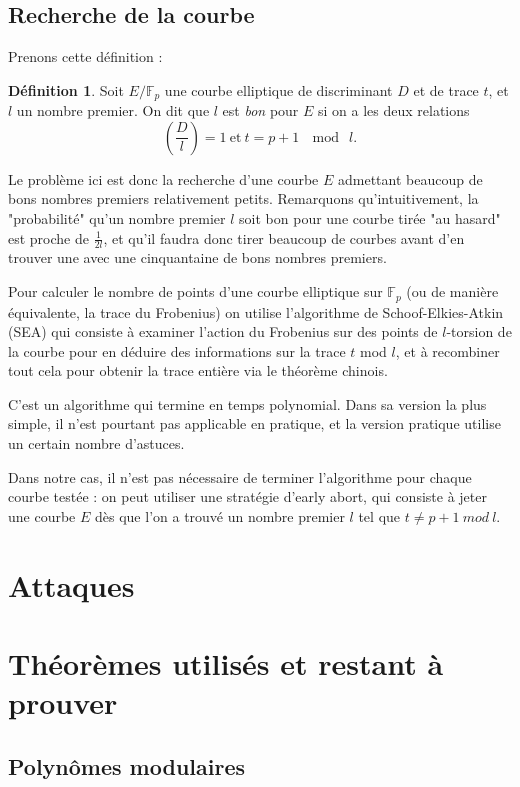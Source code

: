 \documentclass[11pt,a4paper]{article}
\newcommand{\F}{\mathbb{F}}
\theoremstyle{definition}
\newtheorem{defi}[thm]{Définition}
\begin{document}
\subsection{Recherche de la courbe}

Prenons cette définition :

\begin{defi}
Soit $E/\F_p$ une courbe elliptique de discriminant $D$ et de trace $t$, et $l$ un nombre premier. On dit que $l$ est \emph{bon} pour $E$ si on a les deux relations
$$ \left(\frac{D}{l}\right)=1\ \text{et}\ t=p+1\ \mod\ l.$$
\end{defi}

Le problème ici est donc la recherche d'une courbe $E$ admettant beaucoup de bons nombres premiers relativement petits. Remarquons qu'intuitivement, la "probabilité" qu'un nombre premier $l$ soit bon pour une courbe tirée "au hasard" est proche de $\frac{1}{2l}$, et qu'il faudra donc tirer beaucoup de courbes avant d'en trouver une avec une cinquantaine de bons nombres premiers.

Pour calculer le nombre de points d'une courbe elliptique sur $\F_p$ (ou de manière équivalente, la trace du Frobenius) on utilise l'algorithme de Schoof-Elkies-Atkin (SEA) qui consiste à examiner l'action du Frobenius sur des points de $l$-torsion de la courbe pour en déduire des informations sur la trace $t$ mod $l$, et à recombiner tout cela pour obtenir la trace entière via le théorème chinois.

C'est un algorithme qui termine en temps polynomial. Dans sa version la plus simple, il n'est pourtant pas applicable en pratique, et la version pratique utilise un certain nombre d'astuces.

Dans notre cas, il n'est pas nécessaire de terminer l'algorithme pour chaque courbe testée : on peut utiliser une stratégie d'early abort, qui consiste à jeter une courbe $E$ dès que l'on a trouvé un nombre premier $l$ tel que $t\neq p+1\ mod\ l.$


\section{Attaques}


\section{Théorèmes utilisés et restant à prouver}

\subsection{Polynômes modulaires}
\end{document}
